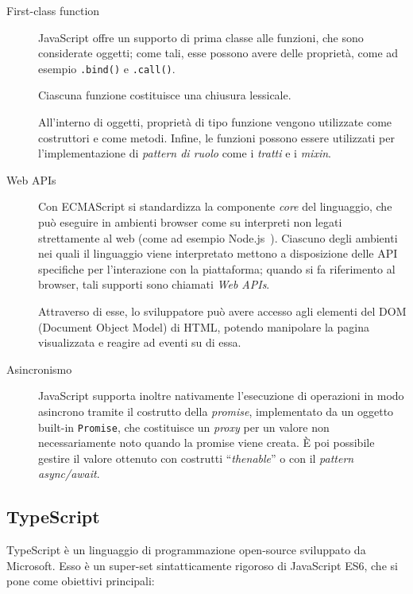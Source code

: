 \begin{description}
        \item[First-class function]
          JavaScript offre un supporto di prima classe alle funzioni, che sono considerate oggetti;
          come tali, esse possono avere delle proprietà, come ad esempio \texttt{.bind()} e \texttt{.call()}. %

          Ciascuna funzione costituisce una chiusura lessicale.

          All'interno di oggetti, proprietà di tipo funzione vengono utilizzate come costruttori e come metodi.
          Infine, le funzioni possono essere utilizzati per l'implementazione di \emph{pattern di ruolo} come i \emph{tratti} e i \emph{mixin}.

        \item[Web APIs]
          Con ECMAScript si standardizza la componente \emph{core} del linguaggio, che può eseguire in ambienti browser come su interpreti non legati strettamente al web (come ad esempio Node.js~\cite{5617064}).
          Ciascuno degli ambienti nei quali il linguaggio viene interpretato mettono a disposizione delle API specifiche per l'interazione con la piattaforma;
          quando si fa riferimento al browser, tali supporti sono chiamati \emph{Web APIs}.

          Attraverso di esse, lo sviluppatore può avere accesso agli elementi del DOM (Document Object Model) di HTML, potendo manipolare la pagina visualizzata e reagire ad eventi su di essa.

        \item[Asincronismo]
          JavaScript supporta inoltre nativamente l'esecuzione di operazioni in modo asincrono tramite il costrutto della \emph{promise}, implementato da un oggetto built-in \texttt{Promise},
          che costituisce un \emph{proxy} per un valore non necessariamente noto quando la promise viene creata.
          È poi possibile gestire il valore ottenuto con costrutti ``\emph{thenable}'' o con il \emph{pattern async/await}.
      \end{description}

    \subsection{TypeScript}\label{subsec:ts}
      TypeScript è un linguaggio di programmazione open-source sviluppato da Microsoft.
      Esso è un super-set sintatticamente rigoroso di JavaScript ES6, che si pone come obiettivi principali:

